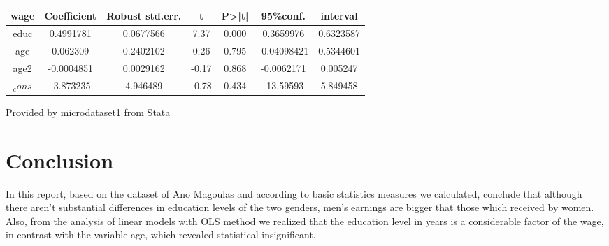 \documentclass[10pt,towside,a4paper]{article}
\begin{document}
\begin{table}[H]
	\begin{Center}
		 \label{tab:title} 
		\begin{tabular}{|c |c |c |c |c |c c|}
		\toprule
		wage &Coefficient & Robust std.err. & t & P>|t| & 95\%conf. & interval \\ 
		\midrule
		educ & 0.4991781 & 0.0677566 & 7.37 & 0.000 & 0.3659976 & 0.6323587\\
		age & 0.062309 & 0.2402102 & 0.26 & 0.795 & -0.04098421 & 0.5344601\\
		age2 & -0.0004851 & 0.0029162 & -0.17 & 0.868 & -0.0062171 & 0.005247\\
		$_cons$ & -3.873235 & 4.946489 & -0.78 & 0.434 & -13.59593 & 5.849458\\
		
		\bottomrule
		
	\end{tabular} \par
	
	Provided by microdataset1 from Stata
	\end{Center}
\end{table}

\section{Conclusion}
	
	In this report, based on the dataset of Ano Magoulas and according to basic statistics measures we calculated, conclude that although there aren’t substantial differences in education levels of the two genders, men’s earnings are bigger that those which received by women. Also, from the analysis of linear models with OLS method we realized that the education level in years is a considerable factor of the wage, in contrast with the variable age, which revealed statistical insignificant.
\end{document}
